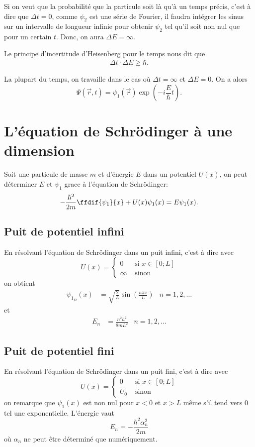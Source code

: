 Si on veut que la probabilité que la particule soit là qu'à un temps précis,
c'est à dire que $\Delta t = 0$,
comme $\psi_2$ est une série de Fourier, il faudra intégrer les sinus
sur un intervalle de longueur infinie
pour obtenir $\psi_2$ tel qu'il soit non nul que pour un certain $t$.
Donc, on aura $\Delta E = \infty$.

Le principe d'incertitude d'Heisenberg pour le temps nous dit que
\begin{align*}
  \Delta t \cdot \Delta E \geq \hbar.
\end{align*}

La plupart du temps, on travaille dans le cas où
$\Delta t = \infty$ et $\Delta E = 0$.
On a alors
\[ \Psi(\vec{r}, t) = \psi_1(\vec{r}) \exp\left(-i\frac{E}{\hbar}t\right). \]

\section{L'équation de Schrödinger à une dimension}
Soit une particule de masse $m$ et d'énergie $E$ dans un potentiel $U(x)$,
on peut déterminer $E$ et $\psi_1$ grace à l'équation de Schrödinger:
\[ -\frac{\hbar^2}{2m}\ffdif{\psi_1}{x} + U(x) \psi_1(x) = E\psi_1(x). \]

\subsection{Puit de potentiel infini}
En résolvant l'équation de Schrödinger dans un puit infini,
c'est à dire avec
\[ U(x) = \left\{
  \begin{aligned}
    0 & \text{ si } x \in [0; L]\\
    \infty & \text{ sinon}
  \end{aligned}
\right. \]
on obtient
\begin{align*}
  {\psi_1}_n(x) & =
  \sqrt{\frac{2}{L}}\sin\left(\frac{n\pi x}{L}\right) & n = 1, 2, \ldots
\end{align*}
et
\begin{align*}
  E_n & = \frac{n^2h^2}{8mL^2} & n = 1, 2, \ldots
\end{align*}

\subsection{Puit de potentiel fini}
En résolvant l'équation de Schrödinger dans un puit fini,
c'est à dire avec
\[ U(x) = \left\{
  \begin{aligned}
    0 & \text{ si } x \in [0; L]\\
    U_0 & \text{ sinon}
  \end{aligned}
\right. \]
on remarque que $\psi_1(x)$ est non nul pour $x < 0$ et $x > L$
même s'il tend vers 0 tel une exponentielle.
L'énergie vaut
\[
  E_n = -\frac{\hbar^2\alpha_n^2}{2m}
\]
où $\alpha_n$ ne peut être déterminé que numériquement.

